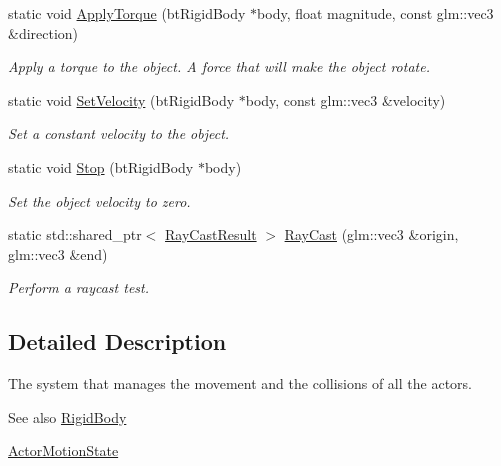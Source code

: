 \begin{DoxyCompactItemize}
static void \hyperlink{classTarbora_1_1PhysicsEngine_a7bfaabd962f0825536195708d4442a3d}{Apply\+Torque} (bt\+Rigid\+Body $\ast$body, float magnitude, const glm\+::vec3 \&direction)
\begin{DoxyCompactList}\small\item\em Apply a torque to the object. A force that will make the object rotate. \end{DoxyCompactList}\item 
static void \hyperlink{classTarbora_1_1PhysicsEngine_a1c4650ee51cd6094b6faa141206a6403}{Set\+Velocity} (bt\+Rigid\+Body $\ast$body, const glm\+::vec3 \&velocity)
\begin{DoxyCompactList}\small\item\em Set a constant velocity to the object. \end{DoxyCompactList}\item 
\mbox{\label{classTarbora_1_1PhysicsEngine_aca13d6e0e807662cd096fe899c5b8776}} 
static void \hyperlink{classTarbora_1_1PhysicsEngine_aca13d6e0e807662cd096fe899c5b8776}{Stop} (bt\+Rigid\+Body $\ast$body)
\begin{DoxyCompactList}\small\item\em Set the object velocity to zero. \end{DoxyCompactList}\item 
static std\+::shared\+\_\+ptr$<$ \hyperlink{structTarbora_1_1RayCastResult}{Ray\+Cast\+Result} $>$ \hyperlink{classTarbora_1_1PhysicsEngine_a4650b5c17a52953357ae693f5c07bf68}{Ray\+Cast} (glm\+::vec3 \&origin, glm\+::vec3 \&end)
\begin{DoxyCompactList}\small\item\em Perform a raycast test. \end{DoxyCompactList}\end{DoxyCompactItemize}


\subsection{Detailed Description}
The system that manages the movement and the collisions of all the actors. 

\begin{DoxySeeAlso}{See also}
\hyperlink{classTarbora_1_1RigidBody}{Rigid\+Body} 

\hyperlink{classTarbora_1_1ActorMotionState}{Actor\+Motion\+State} 
\end{DoxySeeAlso}


